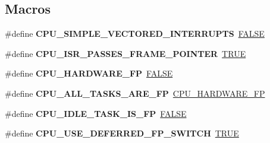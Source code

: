 \subsection*{Macros}
\begin{DoxyCompactItemize}
\item 
\mbox{\label{group__RTEMSScoreCPUMIPS_ga1eca01dbb1ef2873349cc4e222509f0a}} 
\#define {\bfseries C\+P\+U\+\_\+\+S\+I\+M\+P\+L\+E\+\_\+\+V\+E\+C\+T\+O\+R\+E\+D\+\_\+\+I\+N\+T\+E\+R\+R\+U\+P\+TS}~\mbox{\hyperlink{group__RTEMSScoreBaseDefs_gaa93f0eb578d23995850d61f7d61c55c1}{F\+A\+L\+SE}}
\item 
\mbox{\label{group__RTEMSScoreCPUMIPS_ga30c4d320f85b1383c5059da5b19b164a}} 
\#define {\bfseries C\+P\+U\+\_\+\+I\+S\+R\+\_\+\+P\+A\+S\+S\+E\+S\+\_\+\+F\+R\+A\+M\+E\+\_\+\+P\+O\+I\+N\+T\+ER}~\mbox{\hyperlink{group__RTEMSScoreBaseDefs_gaa8cecfc5c5c054d2875c03e77b7be15d}{T\+R\+UE}}
\item 
\mbox{\label{group__RTEMSScoreCPUMIPS_ga112f88f13afe8bb8f1b13f1ca7e09b8d}} 
\#define {\bfseries C\+P\+U\+\_\+\+H\+A\+R\+D\+W\+A\+R\+E\+\_\+\+FP}~\mbox{\hyperlink{group__RTEMSScoreBaseDefs_gaa93f0eb578d23995850d61f7d61c55c1}{F\+A\+L\+SE}}
\item 
\mbox{\label{group__RTEMSScoreCPUMIPS_ga225de03a8647bf307a73cf907969778d}} 
\#define {\bfseries C\+P\+U\+\_\+\+A\+L\+L\+\_\+\+T\+A\+S\+K\+S\+\_\+\+A\+R\+E\+\_\+\+FP}~\mbox{\hyperlink{sparc_2include_2rtems_2score_2cpu_8h_a112f88f13afe8bb8f1b13f1ca7e09b8d}{C\+P\+U\+\_\+\+H\+A\+R\+D\+W\+A\+R\+E\+\_\+\+FP}}
\item 
\mbox{\label{group__RTEMSScoreCPUMIPS_gaf1c906c8ee4c3d012dc456285e42d3ee}} 
\#define {\bfseries C\+P\+U\+\_\+\+I\+D\+L\+E\+\_\+\+T\+A\+S\+K\+\_\+\+I\+S\+\_\+\+FP}~\mbox{\hyperlink{group__RTEMSScoreBaseDefs_gaa93f0eb578d23995850d61f7d61c55c1}{F\+A\+L\+SE}}
\item 
\mbox{\label{group__RTEMSScoreCPUMIPS_ga155bcf88149016c6c58f30eeab9f1598}} 
\#define {\bfseries C\+P\+U\+\_\+\+U\+S\+E\+\_\+\+D\+E\+F\+E\+R\+R\+E\+D\+\_\+\+F\+P\+\_\+\+S\+W\+I\+T\+CH}~\mbox{\hyperlink{group__RTEMSScoreBaseDefs_gaa8cecfc5c5c054d2875c03e77b7be15d}{T\+R\+UE}}

\end{DoxyCompactItemize}
